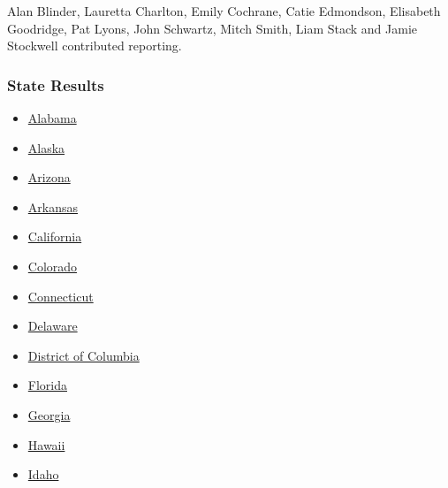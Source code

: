Alan Blinder, Lauretta Charlton, Emily Cochrane, Catie Edmondson,
Elisabeth Goodridge, Pat Lyons, John Schwartz, Mitch Smith, Liam Stack
and Jamie Stockwell contributed reporting.

\hypertarget{state-results}{%
\subsubsection{State Results}\label{state-results}}

\begin{itemize}
\tightlist
\item
  \href{https://www.nytimes3xbfgragh.onion/interactive/2018/11/06/us/elections/results-alabama-elections.html}{Alabama}
\item
  \href{https://www.nytimes3xbfgragh.onion/interactive/2018/11/06/us/elections/results-alaska-elections.html}{Alaska}
\item
  \href{https://www.nytimes3xbfgragh.onion/interactive/2018/11/06/us/elections/results-arizona-elections.html}{Arizona}
\item
  \href{https://www.nytimes3xbfgragh.onion/interactive/2018/11/06/us/elections/results-arkansas-elections.html}{Arkansas}
\item
  \href{https://www.nytimes3xbfgragh.onion/interactive/2018/11/06/us/elections/results-california-elections.html}{California}
\item
  \href{https://www.nytimes3xbfgragh.onion/interactive/2018/11/06/us/elections/results-colorado-elections.html}{Colorado}
\item
  \href{https://www.nytimes3xbfgragh.onion/interactive/2018/11/06/us/elections/results-connecticut-elections.html}{Connecticut}
\item
  \href{https://www.nytimes3xbfgragh.onion/interactive/2018/11/06/us/elections/results-delaware-elections.html}{Delaware}
\item
  \href{https://www.nytimes3xbfgragh.onion/interactive/2018/11/06/us/elections/results-district-of-columbia-elections.html}{District
  of Columbia}
\item
  \href{https://www.nytimes3xbfgragh.onion/interactive/2018/11/06/us/elections/results-florida-elections.html}{Florida}
\item
  \href{https://www.nytimes3xbfgragh.onion/interactive/2018/11/06/us/elections/results-georgia-elections.html}{Georgia}
\item
  \href{https://www.nytimes3xbfgragh.onion/interactive/2018/11/06/us/elections/results-hawaii-elections.html}{Hawaii}
\item
  \href{https://www.nytimes3xbfgragh.onion/interactive/2018/11/06/us/elections/results-idaho-elections.html}{Idaho}
\end{itemize}

